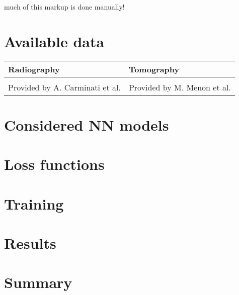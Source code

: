 \documentclass[letterpaper,10pt,english]{sphinxmanual}
\begin{document}
 much of this mark\sphinxhyphen{}up is done manually!


\section{Available data}
\label{\detokenize{ML4NeutronImageSegmentation:available-data}}

\begin{savenotes}\sphinxattablestart
\centering
\begin{tabulary}{\linewidth}[t]{|T|T|}
\hline
\sphinxstyletheadfamily 
Radiography
&\sphinxstyletheadfamily 
Tomography
\\
\hline
{}
&
\\
\hline
Provided by A. Carminati et al.
&
Provided by M. Menon et al.
\\
\hline
\end{tabulary}
\par
\sphinxattableend\end{savenotes}


\section{Considered NN models}
\label{\detokenize{ML4NeutronImageSegmentation:considered-nn-models}}

\section{Loss functions}
\label{\detokenize{ML4NeutronImageSegmentation:loss-functions}}

\section{Training}
\label{\detokenize{ML4NeutronImageSegmentation:training}}

\section{Results}
\label{\detokenize{ML4NeutronImageSegmentation:results}}

\section{Summary}
\label{\detokenize{ML4NeutronImageSegmentation:summary}}
\end{document}
